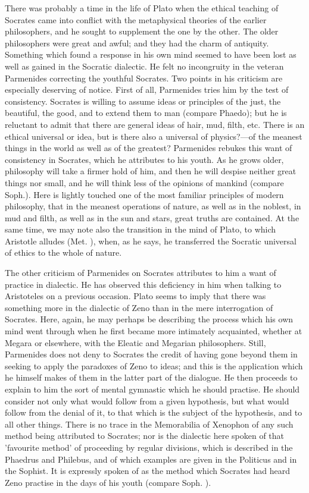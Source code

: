 \documentclass[11pt,letter]{article}
\begin{document}
\par  There was probably a time in the life of Plato when the ethical teaching of Socrates came into conflict with the metaphysical theories of the earlier philosophers, and he sought to supplement the one by the other. The older philosophers were great and awful; and they had the charm of antiquity. Something which found a response in his own mind seemed to have been lost as well as gained in the Socratic dialectic. He felt no incongruity in the veteran Parmenides correcting the youthful Socrates. Two points in his criticism are especially deserving of notice. First of all, Parmenides tries him by the test of consistency. Socrates is willing to assume ideas or principles of the just, the beautiful, the good, and to extend them to man (compare Phaedo); but he is reluctant to admit that there are general ideas of hair, mud, filth, etc. There is an ethical universal or idea, but is there also a universal of physics?—of the meanest things in the world as well as of the greatest? Parmenides rebukes this want of consistency in Socrates, which he attributes to his youth. As he grows older, philosophy will take a firmer hold of him, and then he will despise neither great things nor small, and he will think less of the opinions of mankind (compare Soph.). Here is lightly touched one of the most familiar principles of modern philosophy, that in the meanest operations of nature, as well as in the noblest, in mud and filth, as well as in the sun and stars, great truths are contained. At the same time, we may note also the transition in the mind of Plato, to which Aristotle alludes (Met. ), when, as he says, he transferred the Socratic universal of ethics to the whole of nature.

\par  The other criticism of Parmenides on Socrates attributes to him a want of practice in dialectic. He has observed this deficiency in him when talking to Aristoteles on a previous occasion. Plato seems to imply that there was something more in the dialectic of Zeno than in the mere interrogation of Socrates. Here, again, he may perhaps be describing the process which his own mind went through when he first became more intimately acquainted, whether at Megara or elsewhere, with the Eleatic and Megarian philosophers. Still, Parmenides does not deny to Socrates the credit of having gone beyond them in seeking to apply the paradoxes of Zeno to ideas; and this is the application which he himself makes of them in the latter part of the dialogue. He then proceeds to explain to him the sort of mental gymnastic which he should practise. He should consider not only what would follow from a given hypothesis, but what would follow from the denial of it, to that which is the subject of the hypothesis, and to all other things. There is no trace in the Memorabilia of Xenophon of any such method being attributed to Socrates; nor is the dialectic here spoken of that 'favourite method' of proceeding by regular divisions, which is described in the Phaedrus and Philebus, and of which examples are given in the Politicus and in the Sophist. It is expressly spoken of as the method which Socrates had heard Zeno practise in the days of his youth (compare Soph. ).
\end{document}
